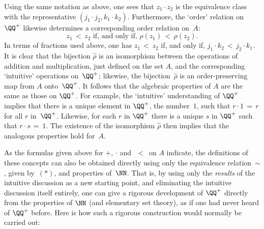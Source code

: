     Using the same notation as above, one sees that $z_{1}{\cdot}z_{2}$ is the equivalence class
    with the representative $(j_{1}{\cdot}j_{2}, k_{1}{\cdot}k_{2})$.
    Furthermore, the `order' relation on ${\QQ}^{+}$ likewise determines a corresponding order relation on~$A$:
        \begin{displaymath}
        z_{1}\,<\,z_{2} \mbox{ if, and only if, } {\rho}(z_{1})\,<\,{\rho}(z_{2}).
        \end{displaymath}
    In terms of fractions used above, one has $z_{1}\,<\,z_{2}$ if, and only if, $j_{1}{\cdot}k_{2}\,<\,j_{2}{\cdot}k_{1}$.
    It is clear that the bijection $\hat{{\rho}}$ is an isomorphism between the operations of addition and multiplication,
    just defined on the set $A$, and the corresponding `intuitive' operations on~${\QQ}^{+}$;
    likewise, the bijection~$\hat{{\rho}}$ is an order-preserving map from $A$ onto~${\QQ}^{+}$.
    It follows that the algebraic properties of $A$ are the same as those on ${\QQ}^{+}$.
    For example, the `intuitive' understanding of ${\QQ}^{+}$ implies that there is a unique element in ${\QQ}^{+}$, the number~$1$, such that $r{\cdot}1\,=\, r$
    for all $r$ in~${\QQ}^{+}$. Likewise, for each $r$ in ${\QQ}^{+}$ there is a unique $s$ in ${\QQ}^{+}$ such that $r{\cdot}s \,=\, 1$.
    The existence of the isomorphism $\hat{{\rho}}$ then implies that the analogous properties hold for~$A$.

        As the formulas given above for $+$, ${\cdot}$ and~$\,<\,$ on $A$ indicate,
    the definitions of these concepts can also be obtained directly using only the equivalence relation~$\sim$, given by~$({\ast})$, and properties of~${\NN}$.
    That is, by using only the {\em results} of the intuitive discussion as a new starting point, and eliminating the intuitive discussion itself entirely,
    one can give a rigorous development of ${\QQ}^{+}$ directly from the properties of ${\NN}$ (and elementary set theory),
    as if one had never heard of ${\QQ}^{+}$ before. Here is how such a rigorous construction would normally be carried out:

